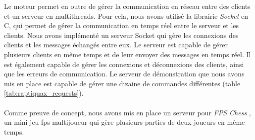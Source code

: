    Le moteur permet en outre de gérer la communication en réseau entre
    des clients et un serveur en multithreads. Pour cela, nous avons utilisé
    la librairie \emph{Socket} en C, qui permet de gérer la communication en
    temps réel entre le serveur et les clients.
    Nous avons implémenté un serveur Socket qui gère les connexions des
    clients et les messages échangés entre eux. Le serveur est capable de
    gérer plusieurs clients en même temps et de leur envoyer des messages
    en temps réel. Il est également capable de gérer les connexions et
    déconnexions des clients, ainsi que les erreurs de communication.
    Le serveur de démonstration que nous avons mis en place est capable de
    gérer une dizaine de commandes différentes (table \ref{tab:raptiquax_requests}).
    \\ \\
    Comme preuve de concept, nous avons mis en place un serveur pour \og \emph{FPS Chess} \fg{}, un
    mini-jeu fps multijoueur qui gère plusieurs parties de deux joueurs en même temps.